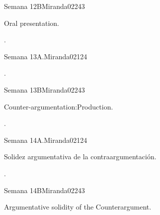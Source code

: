 \begin{syllabus}
\begin{unit}{}{Semana 12B}{Miranda02}{24}{3}
   \begin{topics}
      \item Oral presentation.
   \end{topics}

   \begin{learningoutcomes}
      \item .
      \end{learningoutcomes}
\end{unit}

\begin{unit}{}{Semana 13A.}{Miranda02}{12}{4}
   \begin{topics}
      \item .
   \end{topics}
   \begin{learningoutcomes}
      \item 
   \end{learningoutcomes}
\end{unit}

\begin{unit}{}{Semana 13B}{Miranda02}{24}{3}
   \begin{topics}
      \item Counter-argumentation:Production.
   \end{topics}

   \begin{learningoutcomes}
      \item . 
      \end{learningoutcomes}
\end{unit}

\begin{unit}{}{Semana 14A.}{Miranda02}{12}{4}
   \begin{topics}
      \item Solidez argumentativa de la contraargumentación. 
   \end{topics}
   \begin{learningoutcomes}
      \item .
   \end{learningoutcomes}
\end{unit}

\begin{unit}{}{Semana 14B}{Miranda02}{24}{3}
   \begin{topics}
      \item Argumentative solidity of the Counterargument.
   \end{topics}


\end{unit}
\end{syllabus}
